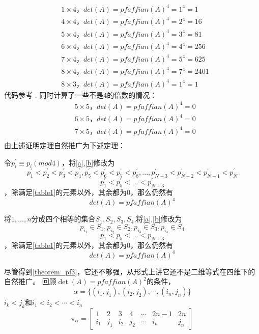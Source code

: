 \documentclass{amsc}          %
\numberwithin{equation}{section} %
\begin{document}
\begin{align*}
&1 \times4，det(A) = pfaffian(A)^{4} = 1^{4}=1\\
&4 \times4，det(A) = pfaffian(A)^{4} = 2^{4}=16\\
&5 \times4，det(A) = pfaffian(A)^{4} = 3^{4}=81\\
&6 \times4，det(A) = pfaffian(A)^{4} = 4^{4}=256\\
&7 \times4，det(A) = pfaffian(A)^{4} = 5^{4}=625\\
&8 \times4，det(A) = pfaffian(A)^{4} = 7^{4}=2401\\
&8 \times3，det(A) = pfaffian(A)^{4} = 1^{4}=1
\end{align*}
代码参考 \cite{IM}.
同时计算了一些不是4的倍数的情况：
\begin{align*}
&5 \times5，det(A) = pfaffian(A)^{4} =0\\
&6 \times5，det(A) = pfaffian(A)^{4} =0\\
&7 \times5，det(A) = pfaffian(A)^{4} =0\\
\end{align*}
由上述证明定理自然推广为下述定理：

\begin{theorem}
令$p^{'}_{i}\equiv p_{i} (mod 4)$，将\ref{a},\ref{b}修改为
\begin{equation}\label{aa}p^{'}_{1}<p^{'}_{2}<p^{'}_{3}<p^{'}_{4},p^{'}_{5}<p^{'}_{6}<p^{'}_{7}<p^{'}_{8}
   ,...,p^{'}_{N-3}<p^{'}_{N-2}<p^{'}_{N-1}<p^{'}_{N}\end{equation}
\begin{equation}\label{bb}p^{'}_{1}<p^{'}_{5}<...<p^{'}_{N-3}\end{equation}，除满足\ref{table1}的元素以外，其余都为0，那么仍然有$$det(A)=pfaffian(A)^{4}$$
\end{theorem}

\begin{theorem}\label{theorem_pf3}
将$1, \dots, n$分成四个相等的集合$S_{1},S_{2},S_{3},S_{4}$,将\ref{a},\ref{b}修改为
\begin{equation}p_{i_{1}} \in S_{1}, p_{i_{2}} \in S_{2}, p_{i_{3}} \in S_{3}, p_{i_{4}} \in S_{4}\end{equation}
\begin{equation}\label{bb}p_{1}<p_{5}<...<p_{N-3}\end{equation}，除满足\ref{table1}的元素以外，其余都为0，那么仍然有$$det(A)=pfaffian(A)^{4}$$
\end{theorem}


尽管得到\ref{theorem_pf3}，它还不够强，从形式上讲它还不是二维等式在四维下的自然推广。
回顾$\det(A)=pfaffian (A)^{2}$的条件，
$$\alpha =\{(i_{1},j_{1}),(i_{2},j_{2}),\cdots ,(i_{n},j_{n})\}$$
$i_{k}<j_{k}$和$i_{1}<i_{2}<\cdots <i_{n}$
$${\displaystyle \pi _{\alpha }={\begin{bmatrix}1&2&3&4&\cdots &2n-1&2n\\i_{1}&j_{1}&i_{2}&j_{2}&\cdots &i_{n}&j_{n}\end{bmatrix}}}$$
\end{document}
